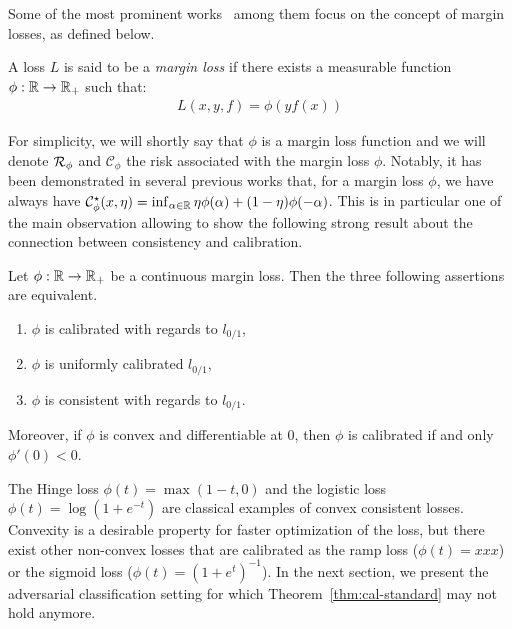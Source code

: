 Some of the most prominent works~\citep{zhang2004statistical,bartlett2006convexity,steinwart2007compare} among them focus on the concept of margin losses, as defined below. 

\begin{definition}
A loss $L$ is said to be a \emph{margin loss} if there exists a measurable function $\phi:\mathbb{R}\to\mathbb{R}_+$ such that: 
\begin{align*}
    L(x,y,f) = \phi(yf(x))
\end{align*}
\end{definition}
For simplicity, we will shortly say that $\phi$ is a margin loss function and we will denote $\mathcal{R}_\phi$ and $\mathcal{C}_\phi$ the risk associated with the margin loss $\phi$. Notably, it has been demonstrated in several previous works\citet{zhang2004statistical,bartlett2006convexity,steinwart2007compare} that, for a margin loss $\phi$, we have always have
$ \mathcal{C}^\star_\phi(x,\eta) = \inf_{\alpha\in\mathbb{R}}\eta \phi(\alpha)+(1-\eta)\phi(-\alpha)$. This is in particular one of the main observation allowing to show the following strong result about the connection between consistency and calibration.

\begin{thm}
\label{thm:cal-standard}
Let $\phi:\mathbb{R}\to\mathbb{R}_+$ be  a continuous margin loss. Then the three following assertions are equivalent.
    \begin{enumerate}
    \item $\phi$ is calibrated with regards to $l_{0/1}$,
    \item $\phi$ is uniformly calibrated $l_{0/1}$,
    \item $\phi$ is consistent with regards to $l_{0/1}$.
    \end{enumerate} 
Moreover, if $\phi$ is convex and differentiable at $0$, then $\phi$ is calibrated if and only $\phi'(0)<0$.
\end{thm}


The Hinge loss $\phi(t) = \max (1-t,0)$ and the logistic loss $\phi(t) = \log(1+e^{-t})$ are classical examples of convex consistent losses. Convexity is a desirable property for faster optimization of the loss, but there exist other non-convex losses that are calibrated as the ramp loss ($\phi(t) = xxx$) or the sigmoid loss ($\phi(t) = (1+e^t)^{-1}$). In the next section, we present the adversarial classification setting for which Theorem~\ref{thm:cal-standard} may not hold anymore. 



